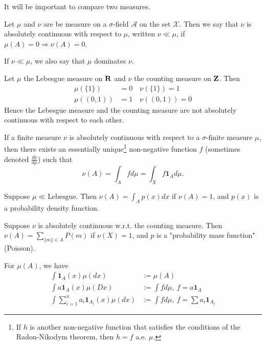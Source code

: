 \documentclass[twoside]{article}
\begin{document}
It will be important to compare two measures.

\begin{definition}\label{def:absolutecontinuity}\citep[Def. 1.9, p.~7]{keener}
  Let $\mu$ and $\nu$ are be measure on a $\sigma$-field $\mathcal A$ on the
  set $\mathcal X$. Then we say that $\nu$ is absolutely continuous with respect
  to $\mu$, written $\nu \ll \mu$, if $\mu(A) = 0 \Rightarrow \nu(A) = 0$.
\end{definition}
If $\nu \ll \mu$, we also say that $\mu$ dominates $\nu$.

\begin{example}  Let $\mu$ the Lebesgue measure on $\mathbf{R}$ and $\nu$ the counting
  measure on $\mathbf{Z}$.  Then
  \begin{align*}
    \mu(\{1\}) &= 0 \quad \nu(\{1\}) = 1 \\
    \mu((0, 1)) &= 1 \quad \nu((0, 1)) = 0
  \end{align*}
  Hence the Lebesgue measure and the counting measure are not absolutely continuous
  with respect to each other.
\end{example}

\begin{theorem}\citep[Def. 1.10, p.~7]{keener}
  If a finite measure $\nu$ is absolutely continuous with respect to a
  $\sigma$-finite measure $\mu$, then there exists an essentially unique\footnote{If $h$ is
  another non-negative function that satisfies the conditions of the Radon-Nikodym theorem,
  then $h=f$ a.e. $\mu$.} non-negative function $f$
  (sometimes denoted $\frac{d\nu}{d\mu}$) such that
  \[\nu(A) = \int_A f d\mu = \int_X f \mathbf{1}_A d\mu.\]
\end{theorem}



\begin{example}
  Suppose $\mu \ll \text{Lebesgue}$. Then $\nu(A) = \int_A p(x) dx$ if $\nu(A) =
1$, and $p(x)$ is a probability density function.
\end{example}

\begin{example}
  Suppose $\nu$ is absolutely continuous w.r.t. the counting measure. Then $\nu(A)
= \sum_{\{m\} \in A} P(m)$ if $\nu(X) = 1$, and $p$ is a "probability mass
function" (Poisson).
\end{example}

For $\mu(A)$, we have
\begin{align*}
   \int \mathbf{1}_A(x) \mu(dx) &:= \mu(A) \\
   \int a \mathbf{1}_A(x) \mu(Dx) &:= \int f d\mu,\ f = a \mathbf{1}_A \\
   \int \sum_{i=1}^n a_i \mathbf{1}_{A_i}(x) \mu(dx) &:= \int f d\mu,\ f = \sum
   a_i \mathbf{1}_{A_i}
\end{align*}
\end{document}
